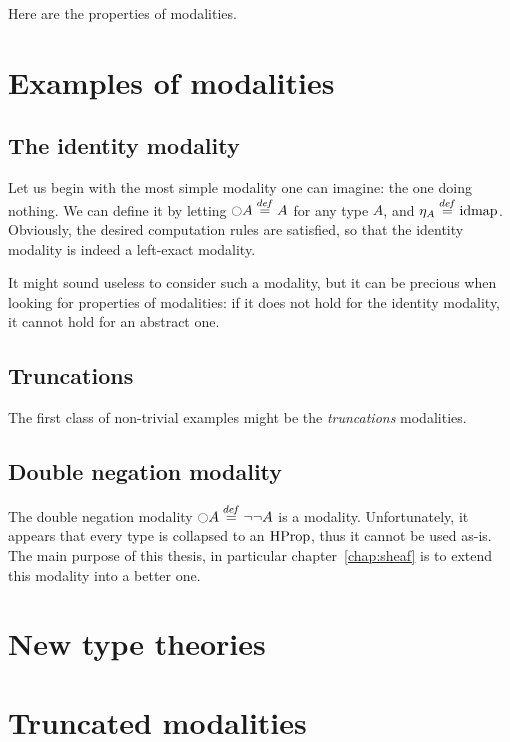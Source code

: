 \begin{prop}\label{prop:mod_prop}
  Here are the properties of modalities.
\end{prop}

\section{Examples of modalities}
\label{sec:modalities-examples}

\subsection{The identity modality}
\label{ssec:id_mod}

Let us begin with the most simple modality one can imagine: the one
doing nothing. We can define it by letting $\ocircle A \overset{de\hspace{-0.2ex}f}{=} A$ for any type
$A$, and $\eta_A \overset{de\hspace{-0.2ex}f}{=} \operatorname{\mathrm{idmap}}$. Obviously, the desired computation
rules are satisfied, so that the identity modality is indeed a
left-exact modality.

It might sound useless to consider such a modality, but it can be
precious when looking for properties of modalities: if it does not
hold for the identity modality, it cannot hold for an abstract one.


\subsection{Truncations}
\label{ssec:truncations}

The first class of non-trivial examples might be the {\em truncations}
modalities.

\subsection{Double negation modality}
\label{ssec:notnot}

The double negation modality $\ocircle A \overset{de\hspace{-0.2ex}f}{=} \lnot\lnot A$ is a
modality. Unfortunately, it appears that every type is collapsed to an
$\operatorname{HProp}$, thus it cannot be used as-is. The main purpose of this
thesis, in particular chapter~\ref{chap:sheaf} is to extend this
modality into a better one.

\section{New type theories}
\label{sec:new-type-theories}

\begin{prop}\label{prop:consistent}
  
\end{prop}

\section{Truncated modalities}
\label{sec:trunc_modalities}

